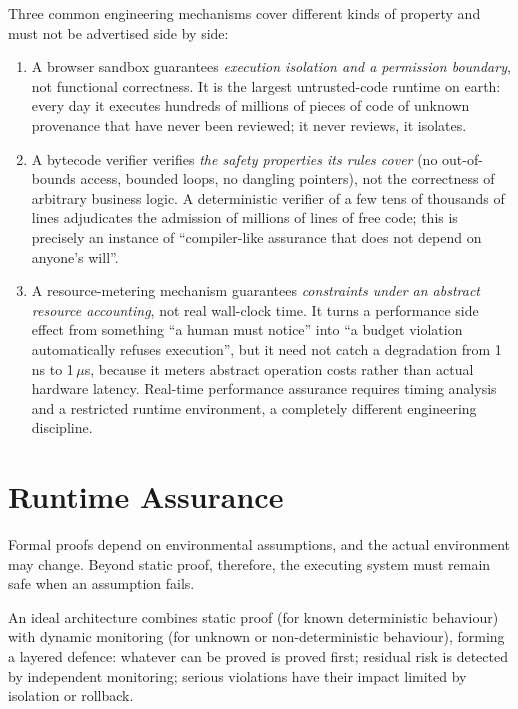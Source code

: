 \begin{remark}\label{rmk:three-prototypes}
Three common engineering mechanisms cover different kinds of property and must not be
advertised side by side:
\begin{enumerate}[label=(\alph*)]
\item A browser sandbox guarantees \emph{execution isolation and a permission boundary}, not
      functional correctness. It is the largest untrusted-code runtime on earth: every day
      it executes hundreds of millions of pieces of code of unknown provenance that have
      never been reviewed; it never reviews, it isolates.
\item A bytecode verifier verifies \emph{the safety properties its rules cover} (no
      out-of-bounds access, bounded loops, no dangling pointers), not the correctness of
      arbitrary business logic. A deterministic verifier of a few tens of thousands of
      lines adjudicates the admission of millions of lines of free code; this is precisely
      an instance of ``compiler-like assurance that does not depend on anyone's will''.
\item A resource-metering mechanism guarantees \emph{constraints under an abstract resource
      accounting}, not real wall-clock time. It turns a performance side effect from
      something ``a human must notice'' into ``a budget violation automatically refuses
      execution'', but it need not catch a degradation from 1\,ns to 1\,$\mu$s, because it
      meters abstract operation costs rather than actual hardware latency. Real-time
      performance assurance requires timing analysis and a restricted runtime environment,
      a completely different engineering discipline.
\end{enumerate}
\end{remark}

\section{Runtime Assurance}\label{sec:runtime}

Formal proofs depend on environmental assumptions, and the actual environment may change.
Beyond static proof, therefore, the executing system must remain safe when an assumption
fails.

\begin{principle}\label{pr:layered-defense}
An ideal architecture combines static proof (for known deterministic behaviour) with dynamic
monitoring (for unknown or non-deterministic behaviour), forming a layered defence: whatever
can be proved is proved first; residual risk is detected by independent monitoring; serious
violations have their impact limited by isolation or rollback.
\end{principle}

